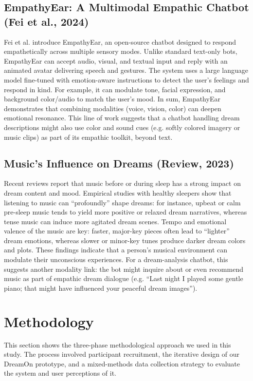 \documentclass[conference]{IEEEtran}
\begin{document}
    \subsection{EmpathyEar: A Multimodal Empathic Chatbot (Fei et al., 2024)}
    Fei et al. introduce EmpathyEar, an open-source chatbot designed to respond empathetically across multiple sensory modes. Unlike standard text-only bots, EmpathyEar can accept audio, visual, and textual input and reply with an animated avatar delivering speech and gestures. The system uses a large language model fine-tuned with emotion-aware instructions to detect the user’s feelings and respond in kind. For example, it can modulate tone, facial expression, and background color/audio to match the user’s mood. In sum, EmpathyEar demonstrates that combining modalities (voice, vision, color) can deepen emotional resonance. This line of work suggests that a chatbot handling dream descriptions might also use color and sound cues (e.g. softly colored imagery or music clips) as part of its empathic toolkit, beyond text.

    \subsection{Music’s Influence on Dreams (Review, 2023)}
    Recent reviews report that music before or during sleep has a strong impact on dream content and mood. Empirical studies with healthy sleepers show that listening to music can “profoundly” shape dreams: for instance, upbeat or calm pre-sleep music tends to yield more positive or relaxed dream narratives, whereas tense music can induce more agitated dream scenes. Tempo and emotional valence of the music are key: faster, major-key pieces often lead to “lighter” dream emotions, whereas slower or minor-key tunes produce darker dream colors and plots. These findings indicate that a person’s musical environment can modulate their unconscious experiences. For a dream-analysis chatbot, this suggests another modality link: the bot might inquire about or even recommend music as part of empathic dream dialogue (e.g. “Last night I played some gentle piano; that might have influenced your peaceful dream images”).
    
	\section{Methodology}
	This section shows the three-phase methodological approach we used in this study. The process involved participant recruitment, the iterative design of our DreamOn prototype, and a mixed-methods data collection strategy to evaluate the system and user perceptions of it.
	
\end{document}
